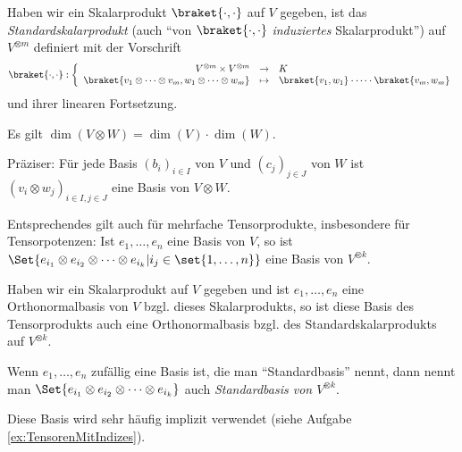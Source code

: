 \begin{lemmadef}
Haben wir ein Skalarprodukt $\braket{\cdot,\cdot}$ auf $V$ gegeben, ist das \emph{Standardskalarprodukt} (auch \enquote{von $\braket{\cdot,\cdot}$ \emph{induziertes} Skalarprodukt}) auf $V^{\otimes m}$ definiert mit der Vorschrift
\[
\braket{\cdot, \cdot} : 
\left\lbrace \begin{array}{rcl}
	V^{\otimes m} \times V^{\otimes m} &\to& K \\
\braket{v_1 \otimes \cdots \otimes v_m, w_1 \otimes \cdots \otimes w_m} &\mapsto& \braket{v_1,w_1} \cdot \cdots \cdot \braket{v_m, w_m}
\end{array}\right.
\]
und ihrer linearen Fortsetzung.
\end{lemmadef}

\begin{lemma}\label{tensorprodukt:dimension}
Es gilt $\dim(V\otimes W) = \dim(V)\cdot\dim(W)$.

Präziser: Für jede Basis $(b_i)_{i\in I}$ von $V$ und $(c_j)_{j\in J}$ von $W$ ist $(v_i\otimes w_j)_{i\in I, j\in J}$ eine Basis von $V\otimes W$.
\end{lemma}

\begin{corollary}
Entsprechendes gilt auch für mehrfache Tensorprodukte, insbesondere für Tensorpotenzen: Ist $e_1,\ldots,e_n$ eine Basis von $V$, so ist $\Set{e_{i_1} \otimes e_{i_2} \otimes \cdots \otimes e_{i_k} | i_j\in\set{1,\ldots,n}}$ eine Basis von $V^{\otimes k}$.

Haben wir ein Skalarprodukt auf $V$ gegeben und ist $e_1, \ldots, e_n$ eine Orthonormalbasis von $V$ bzgl. dieses Skalarprodukts, so ist diese Basis des Tensorprodukts auch eine Orthonormalbasis bzgl. des Standardskalarprodukts auf $V^{\otimes k}$.
\end{corollary}

\begin{definition}
Wenn $e_1, \ldots, e_n$ zufällig eine Basis ist, die man \enquote{Standardbasis} nennt, dann nennt man $\Set{e_{i_1} \otimes e_{i_2} \otimes \cdots \otimes e_{i_k}}$ auch \emph{Standardbasis von $V^{\otimes k}$}.

Diese Basis wird sehr häufig implizit verwendet (siehe Aufgabe \ref{ex:TensorenMitIndizes}).
\end{definition}

